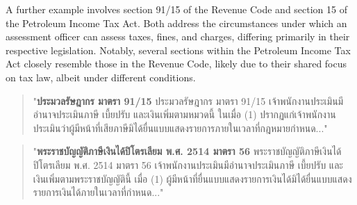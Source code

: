 
A further example involves section 91/15 of the Revenue Code and section 15 of the Petroleum Income Tax Act. Both address the circumstances under which an assessment officer can assess taxes, fines, and charges, differing primarily in their respective legislation. Notably, several sections within the Petroleum Income Tax Act closely resemble those in the Revenue Code, likely due to their shared focus on tax law, albeit under different conditions.

\begin{quote}
\begin{thai}
"\textbf{ประมวลรัษฎากร มาตรา 91/15} ประมวลรัษฎากร มาตรา 91/15 เจ้าพนักงานประเมินมีอำนาจประเมินภาษี เบี้ยปรับ และเงินเพิ่มตามหมวดนี้ ในเมื่อ
(1) ปรากฏแก่เจ้าพนักงานประเมินว่าผู้มีหน้าที่เสียภาษีมิได้ยื่นแบบแสดงรายการภายในเวลาที่กฎหมายกำหนด..."        
\end{thai}
\end{quote}

\begin{quote}
\begin{thai}
"\textbf{พระราชบัญญัติภาษีเงินได้ปิโตรเลียม พ.ศ. 2514 มาตรา 56} พระราชบัญญัติภาษีเงินได้ปิโตรเลียม พ.ศ. 2514 มาตรา 56 เจ้าพนักงานประเมินมีอำนาจประเมินภาษี เบี้ยปรับ และเงินเพิ่มตามพระราชบัญญัตินี้ เมื่อ
(1) ผู้มีหน้าที่ยื่นแบบแสดงรายการเงินได้มิได้ยื่นแบบแสดงรายการเงินได้ภายในเวลาที่กำหนด..."           
\end{thai}
\end{quote}


